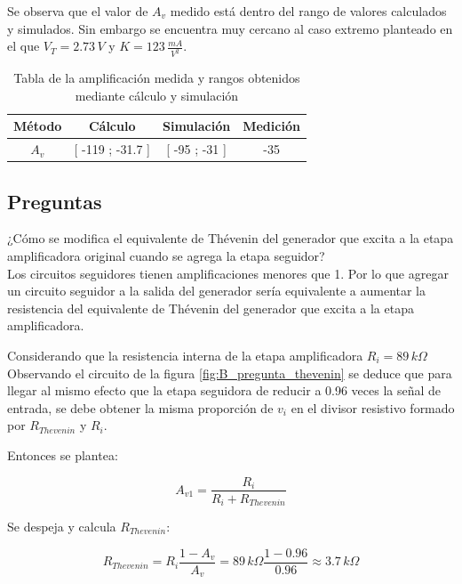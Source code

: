 \documentclass[10pt,spanish,a4paper,notitlepage]{article}
\begin{document}
Se observa que el valor de $A_v$ medido está dentro del rango de valores calculados y simulados.
Sin embargo se encuentra muy cercano al caso extremo planteado en el que $V_T = 2.73\,\unit{V}$ y 
$K = 123\,\unit{\frac{mA}{V^2}}$.

\begin{table}[H]
\centering
\begin{tabular}{|c|c|c||c|} %
\hline
Método & Cálculo &  Simulación & Medición 
\\ \hline
$A_{v}$ & [ -119 ; -31.7 ]  &  [ -95 ; -31 ] & -35
\\ \hline
\end{tabular}
\caption{Tabla de la amplificación medida y rangos obtenidos mediante cálculo y simulación}
\label{table:B_rango_Av}
\end{table}



\subsection{Preguntas}

{\color{OliveGreen} 
¿Cómo se modifica el equivalente de Thévenin del generador que excita a la etapa
amplificadora original cuando se agrega la etapa seguidor?
}\\

Los circuitos seguidores tienen amplificaciones menores que 1. Por lo que
agregar un circuito seguidor a la salida del generador sería equivalente a
aumentar la resistencia del equivalente de Thévenin del generador que
excita a la etapa amplificadora.

Considerando que la resistencia interna de la etapa amplificadora $R_i = 89\,\unit{k\Omega}$
Observando el circuito de la figura \ref{fig:B_pregunta_thevenin} 
se deduce que para llegar al mismo efecto que la etapa seguidora
de reducir a 0.96 veces la señal de entrada, se debe obtener
la misma proporción de $v_i$ en el divisor resistivo formado por
$R_{Thevenin}$ y $R_i$.

Entonces se plantea:

\[ \displaystyle A_{v1} = \frac{R_i}{R_i + R_{Thevenin}} \]

Se despeja y calcula $R_{Thevenin}$:

\[ \displaystyle R_{Thevenin} = R_i \frac{1-A_v}{A_v} =
89\,\unit{k\Omega} \frac{1-0.96}{0.96} \approx 3.7\,\unit{k\Omega}\]
\end{document}
